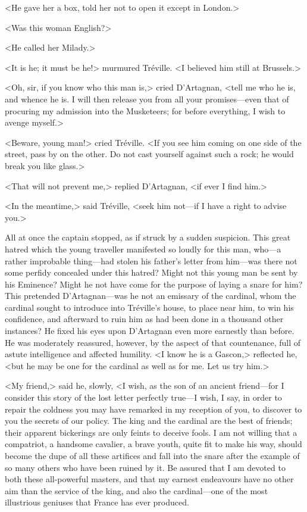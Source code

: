<He gave her a box, told her not to open it except in London.> 

<Was this woman English?> 

<He called her Milady.> 

<It is he; it must be he!> murmured Tréville. <I believed him still at Brussels.> 

<Oh, sir, if you know who this man is,> cried D'Artagnan, <tell me who he is, and whence he is. I will then release you from all your promises—even that of procuring my admission into the Musketeers; for before everything, I wish to avenge myself.> 

<Beware, young man!> cried Tréville. <If you see him coming on one side of the street, pass by on the other. Do not cast yourself against such a rock; he would break you like glass.> 

<That will not prevent me,> replied D'Artagnan, <if ever I find him.> 

<In the meantime,> said Tréville, <seek him not—if I have a right to advise you.> 

All at once the captain stopped, as if struck by a sudden suspicion. This great hatred which the young traveller manifested so loudly for this man, who—a rather improbable thing—had stolen his father's letter from him—was there not some perfidy concealed under this hatred? Might not this young man be sent by his Eminence? Might he not have come for the purpose of laying a snare for him? This pretended D'Artagnan—was he not an emissary of the cardinal, whom the cardinal sought to introduce into Tréville's house, to place near him, to win his confidence, and afterward to ruin him as had been done in a thousand other instances? He fixed his eyes upon D'Artagnan even more earnestly than before. He was moderately reassured, however, by the aspect of that countenance, full of astute intelligence and affected humility. <I know he is a Gascon,> reflected he, <but he may be one for the cardinal as well as for me. Let us try him.> 

<My friend,> said he, slowly, <I wish, as the son of an ancient friend—for I consider this story of the lost letter perfectly true—I wish, I say, in order to repair the coldness you may have remarked in my reception of you, to discover to you the secrets of our policy. The king and the cardinal are the best of friends; their apparent bickerings are only feints to deceive fools. I am not willing that a compatriot, a handsome cavalier, a brave youth, quite fit to make his way, should become the dupe of all these artifices and fall into the snare after the example of so many others who have been ruined by it. Be assured that I am devoted to both these all-powerful masters, and that my earnest endeavours have no other aim than the service of the king, and also the cardinal—one of the most illustrious geniuses that France has ever produced.

